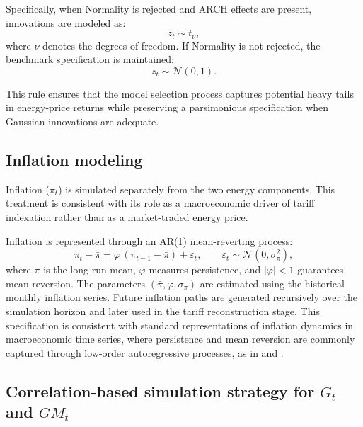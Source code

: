 \documentclass[authoryear,preprint,review,10pt]{elsarticle}
\begin{document}
Specifically, when Normality is rejected and ARCH effects are present, innovations are modeled as:
\begin{equation}
z_t \sim t_\nu,
\end{equation}
where $\nu$ denotes the degrees of freedom. If Normality is not rejected, the benchmark specification is maintained:
\begin{equation}
z_t \sim \mathcal{N}(0,1).
\end{equation}

This rule ensures that the model selection process captures potential heavy tails in energy-price returns while preserving a parsimonious specification when Gaussian innovations are adequate.

\subsection{Inflation modeling}
\label{appendix:inflation}

Inflation ($\pi_t$) is simulated separately from the two energy components. This treatment is consistent with its role as a macroeconomic driver of tariff indexation rather than as a market-traded energy price.

Inflation is represented through an AR(1) mean-reverting process:
\begin{equation}
\pi_t - \bar{\pi} = \varphi\,(\pi_{t-1} - \bar{\pi}) + \varepsilon_t,
\qquad \varepsilon_t \sim \mathcal{N}(0,\sigma_\pi^2),
\end{equation}
where $\bar{\pi}$ is the long-run mean, $\varphi$ measures persistence, and $|\varphi|<1$ guarantees mean reversion. The parameters $(\bar{\pi},\varphi,\sigma_\pi)$ are estimated using the historical monthly inflation series. Future inflation paths are generated recursively over the simulation horizon and later used in the tariff reconstruction stage. This specification is consistent with standard representations of inflation dynamics in macroeconomic time series, where persistence and mean reversion are commonly captured through low-order autoregressive processes, as in \citet{khamis2020} and \citet{babu2015}.

\subsection{Correlation-based simulation strategy for $G_t$ and $GM_t$}
\label{appendix:bivariate}
\end{document}
